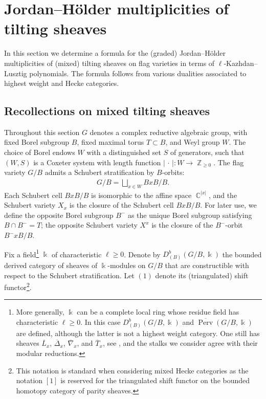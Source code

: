 \documentclass[11pt]{article}
\DeclareMathOperator{\Perv}{Perv}
\DeclareMathOperator{\C}{\mathbb{C}}
\DeclareMathOperator{\Z}{\mathbb{Z}}
\theoremstyle{remark}
\theoremstyle{definition}
\begin{document}
\section{Jordan--H\"{o}lder multiplicities of tilting sheaves}
\label{Sec: JH mult}
	In this section we determine a formula for the (graded) Jordan--H\"{o}lder multiplicities of (mixed) tilting sheaves on flag varieties in terms of $\ell$-Kazhdan--Lusztig polynomials. 
	The formula follows from various dualities associated to highest weight and Hecke categories. 

\subsection{Recollections on mixed tilting sheaves}
\label{Subsec: tilting sheaves}

	Throughout this section $G$ denotes a complex reductive algebraic group, with fixed Borel subgroup $B$, fixed maximal torus $T \subset B$, and Weyl group $W$. 
	The choice of Borel endows $W$ with a distinguished set $S$ of generators, such that $(W,S)$ is a Coxeter system with length function $\vert \, \cdot \, \vert : W \rightarrow \Z_{\geq 0}$. 
	The flag variety $G/B$ admits a Schubert stratification by $B$-orbits:
	\begin{align*}
		G/B = \bigsqcup_{x \in W} B xB/B.
	\end{align*}
	Each Schubert cell $B xB/B$ is isomorphic to the affine space $\C^{|x|}$, and the Schubert variety $X_x$ is the closure of the Schubert cell $ B xB/B$. 
	For later use, we define the opposite Borel subgroup $B^-$ as the unique Borel subgroup satisfying $B \cap B^- = T$; the opposite Schubert variety $X^x$ is the closure of the $B^-$-orbit $B^-  x B/B$. 
	\\
	\par 
	Fix a field\footnote{
    More generally, $\Bbbk$ can be a complete local ring whose residue field has characteristic $\ell \geq 0$. 
    In this case $D_{(B)}^b (G/B , \Bbbk)$ and $\overline{\Perv}(G/B ,\Bbbk)$ are defined, although the latter is not a highest weight category. 
    One still has sheaves $\overline{L}_x$, $\overline{\Delta}_x$, $\overline{\nabla}_x$, and $\overline{T}_x$, see \cite{Jut09,AR16a}, and the stalks we consider agree with their modular reductions.} $\Bbbk$ of characteristic $\ell \geq 0$.
	Denote by $D_{(B)}^b (G/B , \Bbbk)$ the bounded derived category of sheaves of $\Bbbk$-modules on $G/B$ that are constructible with respect to the Schubert stratification.  Let $(1)$ denote its (triangulated) shift functor\footnote{This notation is standard when considering mixed Hecke categories as the notation $[1]$ is reserved for the triangulated shift functor on the bounded homotopy category of parity sheaves.}.
\end{document}
